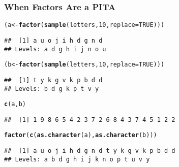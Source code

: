 \documentclass[paper=screen,mathserif]{beamer}\usepackage[]{graphicx}\usepackage[]{color}
\makeatletter
\newcommand{\hlnum}[1]{\textcolor[rgb]{0.686,0.059,0.569}{#1}}%
\newcommand{\hlstd}[1]{\textcolor[rgb]{0.345,0.345,0.345}{#1}}%
\newcommand{\hlkwb}[1]{\textcolor[rgb]{0.69,0.353,0.396}{#1}}%
\newcommand{\hlkwc}[1]{\textcolor[rgb]{0.333,0.667,0.333}{#1}}%
\newcommand{\hlkwd}[1]{\textcolor[rgb]{0.737,0.353,0.396}{\textbf{#1}}}%
\newenvironment{kframe}{%
 \def\at@end@of@kframe{}%
 \ifinner\ifhmode%
  \def\at@end@of@kframe{\end{minipage}}%
  \begin{minipage}{\columnwidth}%
 \fi\fi%
 \def\FrameCommand##1{\hskip\@totalleftmargin \hskip-\fboxsep
 \colorbox{shadecolor}{##1}\hskip-\fboxsep
     \hskip-\linewidth \hskip-\@totalleftmargin \hskip\columnwidth}%
 \MakeFramed {\advance\hsize-\width
   \@totalleftmargin\z@ \linewidth\hsize
   \@setminipage}}%
 {\par\unskip\endMakeFramed%
 \at@end@of@kframe}
\newenvironment{knitrout}{}{} %
\newcommand{\ft}[1]{\frametitle{#1}}
\makeatother
\begin{document}
\begin{frame}[fragile]
  \ft{When Factors Are a PITA}
  
\begin{knitrout}\scriptsize
{}\color{fgcolor}\begin{kframe}
\begin{alltt}
\hlstd{(a} \hlkwb{<-} \hlkwd{factor}\hlstd{(}\hlkwd{sample}\hlstd{(letters,} \hlnum{10}\hlstd{,} \hlkwc{replace} \hlstd{=} \hlnum{TRUE}\hlstd{)))}
\end{alltt}
\begin{verbatim}
##  [1] a u o j i h d g n d
## Levels: a d g h i j n o u
\end{verbatim}
\begin{alltt}
\hlstd{(b} \hlkwb{<-} \hlkwd{factor}\hlstd{(}\hlkwd{sample}\hlstd{(letters,} \hlnum{10}\hlstd{,} \hlkwc{replace} \hlstd{=} \hlnum{TRUE}\hlstd{)))}
\end{alltt}
\begin{verbatim}
##  [1] t y k g v k p b d d
## Levels: b d g k p t v y
\end{verbatim}
\end{kframe}
\end{knitrout}
\begin{knitrout}\scriptsize
{}\color{fgcolor}\begin{kframe}
\begin{alltt}
\hlkwd{c}\hlstd{(a, b)}
\end{alltt}
\begin{verbatim}
##  [1] 1 9 8 6 5 4 2 3 7 2 6 8 4 3 7 4 5 1 2 2
\end{verbatim}
\end{kframe}
\end{knitrout}
\pause
\begin{knitrout}\scriptsize
{}\color{fgcolor}\begin{kframe}
\begin{alltt}
\hlkwd{factor}\hlstd{(}\hlkwd{c}\hlstd{(}\hlkwd{as.character}\hlstd{(a),} \hlkwd{as.character}\hlstd{(b)))}
\end{alltt}
\begin{verbatim}
##  [1] a u o j i h d g n d t y k g v k p b d d
## Levels: a b d g h i j k n o p t u v y
\end{verbatim}
\end{kframe}
\end{knitrout}
\end{frame}
\end{document}

